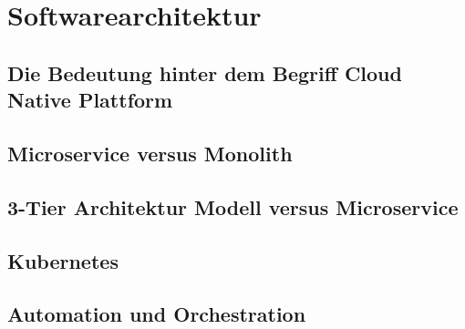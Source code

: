 \newpage
\section{Softwarearchitektur}
\subsection{Die Bedeutung hinter dem Begriff Cloud Native Plattform}
\subsection{Microservice versus Monolith}
\subsection{3-Tier Architektur Modell versus Microservice}
\subsection{Kubernetes}
\subsection{Automation und Orchestration}